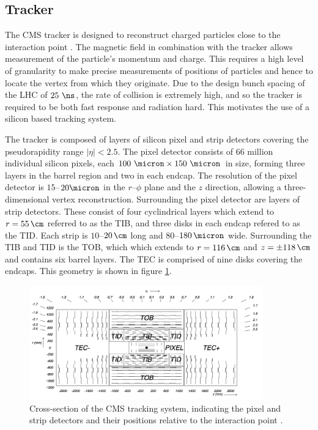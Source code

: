 \subsection{Tracker}
\label{sec:tracker}

The CMS tracker is designed to reconstruct charged particles close to the
interaction point \cite{Chatrchyan:2008aa}. The magnetic field in combination with the tracker allows
measurement of the particle's momentum and charge. This requires a high level of
granularity to make precise measurements of positions of particles and hence to
locate the vertex from which they originate. Due to the design bunch spacing
of the LHC of $25~\ns$, the rate of collision is extremely high, and so the tracker is
required to be both fast response and radiation hard. This motivates the use of a
silicon based tracking system.

The tracker is composed of layers of silicon pixel and strip detectors covering
the pseudorapidity range $|\eta| < 2.5$. The pixel detector consists of 66
million individual silicon pixels, each $100~\micron \times 150~\micron$
in size, forming three layers in the barrel region and two in each endcap. The
resolution of the pixel detector is $15$--$20\micron$ in the $r$--$\phi$ plane
and the $z$ direction, allowing a three-dimensional vertex reconstruction.
Surrounding the pixel detector are layers of strip detectors. These consist of
four cyclindrical layers which extend to $r=55\,\cm$ referred to as the
\ac{TIB}, and three disks in each endcap refered to as the \ac{TID}. Each strip
is $10$--$20\,\cm$ long and $80$--$180\,\micron$ wide. Surrounding the \ac{TIB}
and \ac{TID} is the \ac{TOB}, which which extends to $r=116\,\cm$ and
$z=\pm118\,\cm$ and contains six barrel layers. The \ac{TEC} is comprised of nine
disks covering the endcaps. This geometry is shown in figure
\ref{fig:trackerlayout}.

\begin{figure}[htbp]
   \includegraphics[width=0.9\textwidth]{plots/detector/tracker_layout.png}
\caption[Cross-section of the CMS tracking system, indicating the pixel and
strip detectors and their positions relative to the interaction point.]
{Cross-section of the CMS tracking system, indicating the pixel and
strip detectors and their positions relative to the interaction point \cite{Chatrchyan:2008aa}.}
\label{fig:trackerlayout}
\end{figure}

